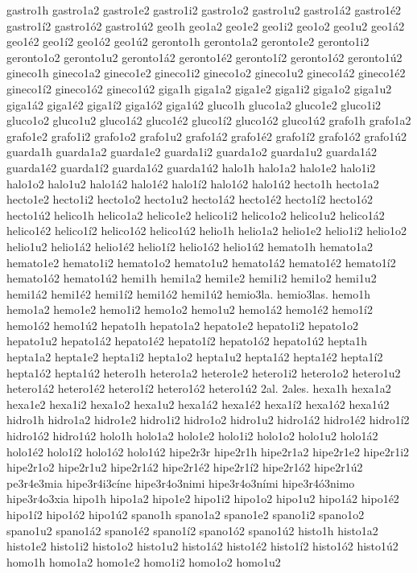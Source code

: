 {gastro1h
gastro1a2 gastro1e2 gastro1i2 gastro1o2 gastro1u2
gastro1á2 gastro1é2 gastro1í2 gastro1ó2 gastro1ú2
geo1h
geo1a2 geo1e2 geo1i2 geo1o2 geo1u2
geo1á2 geo1é2 geo1í2 geo1ó2 geo1ú2
geronto1h
geronto1a2 geronto1e2 geronto1i2 geronto1o2 geronto1u2
geronto1á2 geronto1é2 geronto1í2 geronto1ó2 geronto1ú2
gineco1h
gineco1a2 gineco1e2 gineco1i2 gineco1o2 gineco1u2
gineco1á2 gineco1é2 gineco1í2 gineco1ó2 gineco1ú2
giga1h
giga1a2 giga1e2 giga1i2 giga1o2 giga1u2
giga1á2 giga1é2 giga1í2 giga1ó2 giga1ú2
gluco1h
gluco1a2 gluco1e2 gluco1i2 gluco1o2 gluco1u2
gluco1á2 gluco1é2 gluco1í2 gluco1ó2 gluco1ú2
grafo1h
grafo1a2 grafo1e2 grafo1i2 grafo1o2 grafo1u2
grafo1á2 grafo1é2 grafo1í2 grafo1ó2 grafo1ú2
guarda1h
guarda1a2 guarda1e2 guarda1i2 guarda1o2 guarda1u2
guarda1á2 guarda1é2 guarda1í2 guarda1ó2 guarda1ú2
halo1h
halo1a2 halo1e2 halo1i2 halo1o2 halo1u2
halo1á2 halo1é2 halo1í2 halo1ó2 halo1ú2
hecto1h
hecto1a2 hecto1e2 hecto1i2 hecto1o2 hecto1u2
hecto1á2 hecto1é2 hecto1í2 hecto1ó2 hecto1ú2
helico1h
helico1a2 helico1e2 helico1i2 helico1o2 helico1u2
helico1á2 helico1é2 helico1í2 helico1ó2 helico1ú2
helio1h
helio1a2 helio1e2 helio1i2 helio1o2 helio1u2
helio1á2 helio1é2 helio1í2 helio1ó2 helio1ú2
hemato1h
hemato1a2 hemato1e2 hemato1i2 hemato1o2 hemato1u2
hemato1á2 hemato1é2 hemato1í2 hemato1ó2 hemato1ú2
hemi1h
hemi1a2 hemi1e2 hemi1i2 hemi1o2 hemi1u2
hemi1á2 hemi1é2 hemi1í2 hemi1ó2 hemi1ú2
hemio3la.
hemio3las.
hemo1h
hemo1a2 hemo1e2 hemo1i2 hemo1o2 hemo1u2
hemo1á2 hemo1é2 hemo1í2 hemo1ó2 hemo1ú2
hepato1h
hepato1a2 hepato1e2 hepato1i2 hepato1o2 hepato1u2
hepato1á2 hepato1é2 hepato1í2 hepato1ó2 hepato1ú2
hepta1h
hepta1a2 hepta1e2 hepta1i2 hepta1o2 hepta1u2
hepta1á2 hepta1é2 hepta1í2 hepta1ó2 hepta1ú2
hetero1h
hetero1a2 hetero1e2 hetero1i2 hetero1o2 hetero1u2
hetero1á2 hetero1é2 hetero1í2 hetero1ó2 hetero1ú2
2al.
2ales.
hexa1h
hexa1a2 hexa1e2 hexa1i2 hexa1o2 hexa1u2
hexa1á2 hexa1é2 hexa1í2 hexa1ó2 hexa1ú2
hidro1h
hidro1a2 hidro1e2 hidro1i2 hidro1o2 hidro1u2
hidro1á2 hidro1é2 hidro1í2 hidro1ó2 hidro1ú2
holo1h
holo1a2 holo1e2 holo1i2 holo1o2 holo1u2
holo1á2 holo1é2 holo1í2 holo1ó2 holo1ú2
hipe2r3r
hipe2r1h
hipe2r1a2 hipe2r1e2 hipe2r1i2 hipe2r1o2 hipe2r1u2
hipe2r1á2 hipe2r1é2 hipe2r1í2 hipe2r1ó2 hipe2r1ú2
pe3r4e3mia
hipe3r4i3cíne
hipe3r4o3nimi
hipe3r4o3ními
hipe3r4ó3nimo
hipe3r4o3xia
hipo1h
hipo1a2 hipo1e2 hipo1i2 hipo1o2 hipo1u2
hipo1á2 hipo1é2 hipo1í2 hipo1ó2 hipo1ú2
spano1h
spano1a2 spano1e2 spano1i2 spano1o2 spano1u2
spano1á2 spano1é2 spano1í2 spano1ó2 spano1ú2
histo1h
histo1a2 histo1e2 histo1i2 histo1o2 histo1u2
histo1á2 histo1é2 histo1í2 histo1ó2 histo1ú2
homo1h
homo1a2 homo1e2 homo1i2 homo1o2 homo1u2
}
